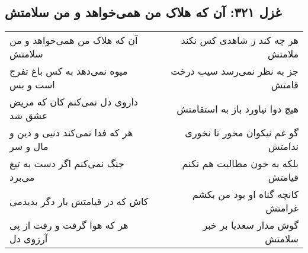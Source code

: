 \begin{center}
\section*{غزل ۳۲۱: آن که هلاک من همی‌خواهد و من سلامتش}
\label{sec:321}
\begin{longtable}{l p{0.5cm} r}
آن که هلاک من همی‌خواهد و من سلامتش
&&
هر چه کند ز شاهدی کس نکند ملامتش
\\
میوه نمی‌دهد به کس باغ تفرج است و بس
&&
جز به نظر نمی‌رسد سیب درخت قامتش
\\
داروی دل نمی‌کنم کان که مریض عشق شد
&&
هیچ دوا نیاورد باز به استقامتش
\\
هر که فدا نمی‌کند دنیی و دین و مال و سر
&&
گو غم نیکوان مخور تا نخوری ندامتش
\\
جنگ نمی‌کنم اگر دست به تیغ می‌برد
&&
بلکه به خون مطالبت هم نکنم قیامتش
\\
کاش که در قیامتش بار دگر بدیدمی
&&
کانچه گناه او بود من بکشم غرامتش
\\
هر که هوا گرفت و رفت از پی آرزوی دل
&&
گوش مدار سعدیا بر خبر سلامتش
\\
\end{longtable}
\end{center}
